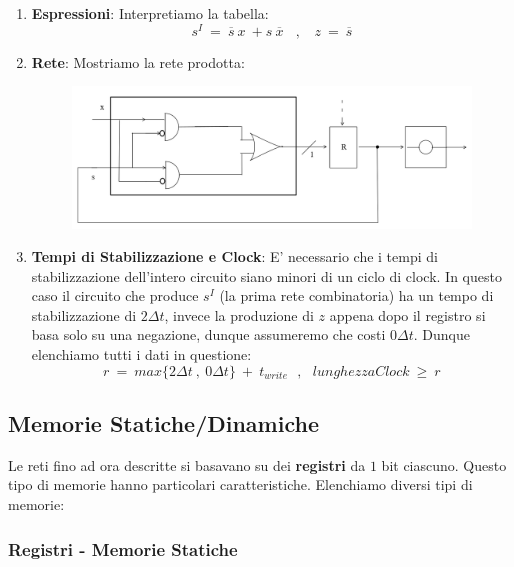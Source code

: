 \documentclass{article}
\begin{document}
\begin{enumerate}
\begin{enumerate}
            \item \textbf{Espressioni}: Interpretiamo la tabella:
            \[ s^{I} \: = \: \overline{s} \: x \: + s \: \overline{x} \: \: \: \: , \: \: \: \: z \: = \: \overline{s} \]
            \item \textbf{Rete}: Mostriamo la rete prodotta:
            \begin{figure}[htbp]
                \includegraphics[scale=0.35]{img/paritaMooreRete.png}
                \centering
            \end{figure}
            \item \textbf{Tempi di Stabilizzazione e Clock}: E' necessario che i tempi di stabilizzazione dell'intero circuito siano minori di un ciclo di clock. In questo caso il circuito che produce $s^{I}$ (la prima rete combinatoria) ha un tempo di stabilizzazione di $2 \Delta t$, invece la produzione di $z$ appena dopo il registro si basa solo su una negazione, dunque assumeremo che costi $0 \Delta t$. Dunque elenchiamo tutti i dati in questione:
            \[ r \: = \: max \{ 2 \Delta t \: , \: 0 \Delta t \} \: + \: t_{write} \: \: \: , \: \: \: lunghezzaClock \: \geq \: r \]
    \end{enumerate}
    
\end{enumerate}

\newpage

\subsection{Memorie Statiche/Dinamiche}

Le reti fino ad ora descritte si basavano su dei \textbf{registri} da $1$ bit ciascuno. Questo tipo di memorie hanno particolari caratteristiche. Elenchiamo diversi tipi di memorie:

\subsubsection{Registri - Memorie Statiche}
\end{document}

